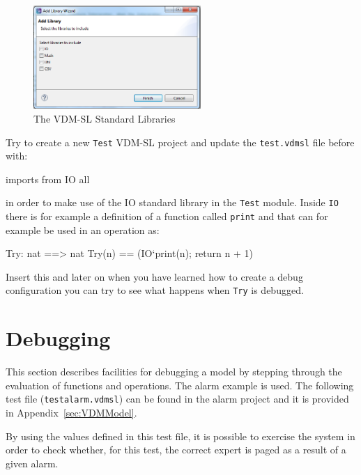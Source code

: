 \begin{figure}[!htb]
\begin{center}
  \includegraphics[width=2.5in]{figures/stdlibs}
  \caption[labelInTOC]{The VDM-SL Standard Libraries}
  \label{fig:stdlibs}
\end{center}
\end{figure}
%
\begin{myexercise}\label{ex:tb-error}
Try to create a new \texttt{Test} VDM-SL project and update the \texttt{test.vdmsl} file before {\bf{}} with:
%
\begin{vdmsl}
imports from IO all
\end{vdmsl}
%
in order to make use of the IO standard library in the \texttt{Test} module. Inside \texttt{IO} there is for example a definition of a function called \texttt{print} and that can for example be used in an
operation as: 
\begin{vdmsl}
Try: nat ==> nat
Try(n) ==
  (IO`print(n);
   return n + 1)
\end{vdmsl}
%
Insert this and later on when you have learned how to create a debug configuration you can try to see what happens when \texttt{Try} is debugged. 
\end{myexercise}
%
\section{Debugging}\label{sec:debugging}
This section describes facilities for debugging a model by stepping through the evaluation of functions and operations. The alarm example is used. The following test file (\texttt{testalarm.vdmsl}) can be found in the alarm project and it is provided in Appendix~\ref{sec:VDMModel}. 
%
%

By using the values defined in this test file, it is possible to exercise the system in order to check whether, for this test, the correct expert is paged as a result of a given alarm.
%
